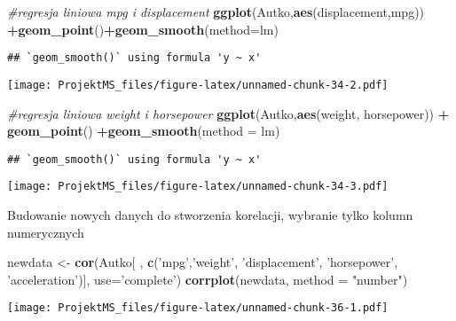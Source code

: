 \documentclass[
]{article}
\newenvironment{Shaded}{\begin{snugshade}}{\end{snugshade}}
\newcommand{\CommentTok}[1]{\textcolor[rgb]{0.56,0.35,0.01}{\textit{#1}}}
\newcommand{\DataTypeTok}[1]{\textcolor[rgb]{0.13,0.29,0.53}{#1}}
\newcommand{\KeywordTok}[1]{\textcolor[rgb]{0.13,0.29,0.53}{\textbf{#1}}}
\newcommand{\NormalTok}[1]{#1}
\newcommand{\OperatorTok}[1]{\textcolor[rgb]{0.81,0.36,0.00}{\textbf{#1}}}
\newcommand{\StringTok}[1]{\textcolor[rgb]{0.31,0.60,0.02}{#1}}
\begin{document}
\begin{Shaded}
\begin{Highlighting}[]
\CommentTok{#regresja liniowa  mpg i displacement}
\KeywordTok{ggplot}\NormalTok{(Autko,}\KeywordTok{aes}\NormalTok{(displacement,mpg)) }\OperatorTok{+}\KeywordTok{geom_point}\NormalTok{()}\OperatorTok{+}\KeywordTok{geom_smooth}\NormalTok{(}\DataTypeTok{method=}\NormalTok{lm) }
\end{Highlighting}
\end{Shaded}

\begin{verbatim}
## `geom_smooth()` using formula 'y ~ x'
\end{verbatim}

\texttt{[image: ProjektMS\_files/figure-latex/unnamed-chunk-34-2.pdf]}

\begin{Shaded}
\begin{Highlighting}[]
\CommentTok{#regresja liniowa  weight i horsepower}
\KeywordTok{ggplot}\NormalTok{(Autko,}\KeywordTok{aes}\NormalTok{(weight, horsepower)) }\OperatorTok{+}\StringTok{ }\KeywordTok{geom_point}\NormalTok{() }\OperatorTok{+}\KeywordTok{geom_smooth}\NormalTok{(}\DataTypeTok{method =}\NormalTok{ lm)}
\end{Highlighting}
\end{Shaded}

\begin{verbatim}
## `geom_smooth()` using formula 'y ~ x'
\end{verbatim}

\texttt{[image: ProjektMS\_files/figure-latex/unnamed-chunk-34-3.pdf]}

Budowanie nowych danych do stworzenia korelacji, wybranie tylko kolumn
numerycznych

\begin{Shaded}
\begin{Highlighting}[]
\NormalTok{newdata <-}\StringTok{ }\KeywordTok{cor}\NormalTok{(Autko[ , }\KeywordTok{c}\NormalTok{(}\StringTok{'mpg'}\NormalTok{,}\StringTok{'weight'}\NormalTok{, }\StringTok{'displacement'}\NormalTok{, }\StringTok{'horsepower'}\NormalTok{, }\StringTok{'acceleration'}\NormalTok{)], }\DataTypeTok{use=}\StringTok{'complete'}\NormalTok{)}
\KeywordTok{corrplot}\NormalTok{(newdata, }\DataTypeTok{method =} \StringTok{"number"}\NormalTok{)}
\end{Highlighting}
\end{Shaded}

\texttt{[image: ProjektMS\_files/figure-latex/unnamed-chunk-36-1.pdf]}
\end{document}
